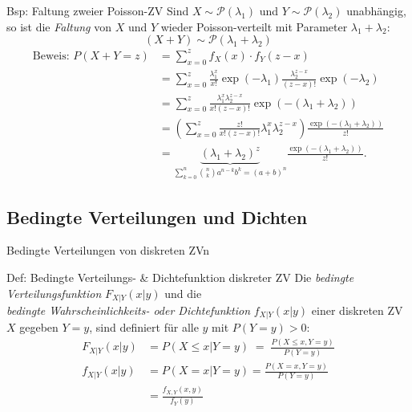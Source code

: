 \documentclass[
  10pt,
  ignorenonframetext,
]{beamer}
\begin{document}
\begin{frame}{Bsp: Faltung zweier Poisson-ZV}
\protect\hypertarget{bsp-faltung-zweier-poisson-zv}{}
Sind \(X \sim {\mathcal P}(\lambda_1)\) und
\(Y \sim {\mathcal P}(\lambda_2)\) unabhängig, so ist die \emph{Faltung}
von \(X\) und \(Y\) wieder Poisson-verteilt mit Parameter
\(\lambda_1 + \lambda_2\): \[
(X + Y) \sim {\mathcal P}(\lambda_1 + \lambda_2)
\] \begin{align*}
\text{Beweis: }P(X+Y=z) &= \sum^z_{x=0} f_X(x) \cdot f_Y(z - x) \\
&= \sum^z_{x=0} \frac{\lambda_1^x}{x!} \exp(-\lambda_1)\frac{\lambda_2^{z-x}}{(z-x)!} \exp(-\lambda_2) \\
&= \sum^z_{x=0} \frac{\lambda_1^x \lambda_2^{z-x}}{x!(z-x)!}\exp(-(\lambda_1 + \lambda_2)) \\
&= \left(\sum^z_{x=0} \frac{z!}{x!(z-x)!}\lambda_1^x \lambda_2^{z-x}\right)\frac{\exp(-(\lambda_1 + \lambda_2))}{z!} \\
&= \underbrace{(\lambda_1 + \lambda_2)^z}_{\sum^n_{k=0} \binom{n}{k} a^{n-k} b^k = (a+b)^n} \frac{\exp(-(\lambda_1 + \lambda_2))}{z!}.
\end{align*}
\end{frame}

\hypertarget{bedingte-verteilungen-und-dichten}{%
\subsection{Bedingte Verteilungen und
Dichten}\label{bedingte-verteilungen-und-dichten}}

\begin{frame}{Bedingte Verteilungen von diskreten ZVn}
\protect\hypertarget{bedingte-verteilungen-von-diskreten-zvn}{}
\begin{block}{Def: Bedingte Verteilungs- \& Dichtefunktion diskreter ZV}
\protect\hypertarget{def-bedingte-verteilungs--dichtefunktion-diskreter-zv}{}
Die \emph{bedingte Verteilungsfunktion} \(F_{X|Y}(x|y)\) und die\\
\emph{bedingte Wahrscheinlichkeits- oder Dichtefunktion}
\(f_{X|Y}(x|y)\) einer diskreten ZV \(X\) gegeben \(Y = y\), sind
definiert für alle \(y\) mit \(P(Y = y) > 0\): \begin{align*}
F_{X|Y}(x|y)  & =  P(X \leq x|Y = y) \; = \;
\frac{P(X \leq x, Y = y)}{P(Y = y)}\\
f_{X|Y}(x|y) & =  P(X = x|Y = y) = \frac{P(X = x, Y = y)}{P(Y = y)}\\
& =  \frac{f_{X,Y}(x,y)}{f_Y(y)}
\end{align*}
\end{block}
\end{frame}
\end{document}

